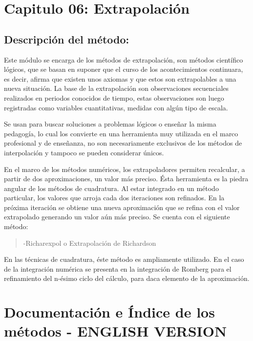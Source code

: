 \documentclass[letterpaper,10pt,oneside]{sphinxmanual}
\theoremstyle{plain}%
\theoremstyle{definition}%
\theoremstyle{remark}%
\begin{document}
\chapter{Capitulo 06: Extrapolación}
\label{chapter06:capitulo-06-extrapoladores}\label{chapter06::doc}

\section{Descripción del método:}
\label{chapter06:descripcion-del-metodo}
Este módulo se encarga de los métodos de extrapolación, son métodos científico lógicos, que se basan en suponer que el curso de los acontecimientos continuara, es decir, afirma que existen unos axiomas y que estos son extrapolables a una nueva situación. La base de la extrapolación son observaciones secuenciales realizados en periodos conocidos de tiempo, estas observaciones son luego registradas como variables cuantitativas, medidas con algún tipo de escala.\medskip

Se usan para buscar soluciones a problemas lógicos o enseñar la misma pedagogía, lo cual los convierte en una herramienta muy utilizada en el marco
profesional y de enseñanza, no son necesariamente exclusivos de los métodos de interpolación y tampoco se pueden considerar únicos.

En el marco de los métodos numéricos, los extrapoladores permiten recalcular, a partir de dos aproximaciones, un valor más preciso. Ésta herramienta es la piedra angular de los métodos de cuadratura. Al estar integrado en un método particular, los valores que arroja cada dos iteraciones son refinados. En la próxima iteración se obtiene una nueva aproximación que se refina con el valor extrapolado generando un valor aún más preciso.
Se cuenta con el siguiente método:

\begin{quote}
\begin{description}
\item[{-Richarexpol o Extrapolación de Richardson}]
\end{description}
\end{quote}

En las técnicas de cuadratura, éste método es ampliamente utilizado. En el caso de la integración numérica se presenta en la integración de Romberg para el refinamiento del n-ésimo ciclo del cálculo, para daca elemento de la aproximación.

\chapter{Documentación e Índice de los métodos - ENGLISH VERSION}
\label{code::doc}\label{code:documentacion-e-indice-de-los-metodos-english-ver}
\end{document}
